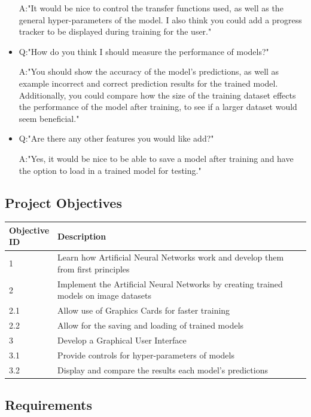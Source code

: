 \documentclass[./project-report/src/latex/project-report.tex]{subfiles}
\begin{document}
\begin{itemize}
          A:"It would be nice to control the transfer functions used, as well as the general hyper-parameters of the model. I also think you could add a progress tracker 
             to be displayed during training for the user."
    \item Q:"How do you think I should measure the performance of models?"

          A:"You should show the accuracy of the model's predictions, as well as example incorrect and correct prediction results for the trained model. Additionally, 
             you could compare how the size of the training dataset effects the performance of the model after training, to see if a larger dataset would seem 
             beneficial."
    \item Q:"Are there any other features you would like add?"

          A:"Yes, it would be nice to be able to save a model after training and have the option to load in a trained model for testing."
\end{itemize}

\subsection{Project Objectives}

\begin{tabular}{|p{0.13\linewidth}|p{0.87\linewidth}|}
      \hline
      \textbf{Objective ID} & \textbf{Description} \\
      \hline
      1 & Learn how Artificial Neural Networks work and develop them from first principles \\
      \hline
      2 & Implement the Artificial Neural Networks by creating trained models on image datasets \\
      \hline
      2.1 & Allow use of Graphics Cards for faster training \\
      \hline
      2.2 & Allow for the saving and loading of trained models \\
      \hline
      3 & Develop a Graphical User Interface \\
      \hline
      3.1 & Provide controls for hyper-parameters of models \\
      \hline
      3.2 & Display and compare the results each model's predictions \\
      \hline
\end{tabular}

\subsection{Requirements}
\end{document}
